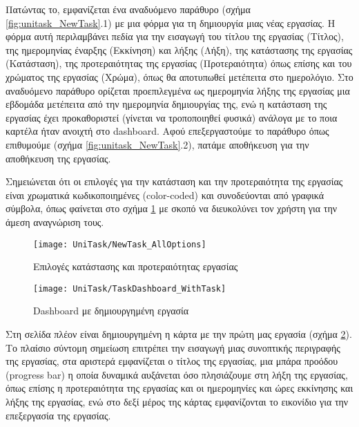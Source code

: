         Πατώντας το, εμφανίζεται ένα αναδυόμενο παράθυρο (σχήμα \ref{fig:unitask_NewTask}.1) με μια φόρμα για τη δημιουργία μιας νέας εργασίας. Η φόρμα αυτή περιλαμβάνει πεδία για την εισαγωγή του τίτλου της εργασίας ({\Zona Τίτλος}), της ημερομηνίας έναρξης ({\Zona Εκκίνηση}) και λήξης ({\Zona Λήξη}), της κατάστασης της εργασίας ({\Zona Κατάσταση}), της προτεραιότητας της εργασίας ({\Zona Προτεραιότητα}) όπως επίσης και του χρώματος της εργασίας ({\Zona Χρώμα}), όπως θα αποτυπωθεί μετέπειτα στο ημερολόγιο. Στο αναδυόμενο παράθυρο ορίζεται προεπιλεγμένα ως ημερομηνία λήξης της εργασίας μια εβδομάδα μετέπειτα από την ημερομηνία δημιουργίας της, ενώ η κατάσταση της εργασίας έχει προκαθοριστεί (γίνεται να τροποποιηθεί φυσικά) ανάλογα με το ποια καρτέλα ήταν ανοιχτή στο dashboard. Αφού επεξεργαστούμε το παράθυρο όπως επιθυμούμε (σχήμα \ref{fig:unitask_NewTask}.2), πατάμε αποθήκευση για την αποθήκευση της εργασίας.

        Σημειώνεται ότι οι επιλογές για την κατάσταση και την προτεραιότητα της εργασίας είναι χρωματικά κωδικοποιημένες (color-coded) και συνοδεύονται από γραφικά σύμβολα, όπως φαίνεται στο σχήμα \ref{fig:unitask_NewTask_AllOptions} με σκοπό να διευκολύνει τον χρήστη για την άμεση αναγνώριση τους.

        \begin{figure}[h!] \noindent \centering
            \texttt{[image: UniTask/NewTask\_AllOptions]}
            \caption{\centering Επιλογές κατάστασης και προτεραιότητας εργασίας}
            \label{fig:unitask_NewTask_AllOptions}
        \end{figure}

        \begin{figure}[h!] \noindent \centering
            \texttt{[image: UniTask/TaskDashboard\_WithTask]}
            \caption{\centering Dashboard με δημιουργημένη εργασία}
            \label{fig:unitask_TaskDashboard_WithTask}
        \end{figure}

        Στη σελίδα πλέον είναι δημιουργημένη η κάρτα με την πρώτη μας εργασία (σχήμα \ref{fig:unitask_TaskDashboard_WithTask}). Το πλαίσιο {\Zona σύντομη σημείωση} επιτρέπει την εισαγωγή μιας συνοπτικής περιγραφής της εργασίας, στα αριστερά εμφανίζεται ο τίτλος της εργασίας, μια μπάρα προόδου (progress bar) η οποία δυναμικά αυξάνεται όσο πλησιάζουμε στη λήξη της εργασίας, όπως επίσης η προτεραιότητα της εργασίας και οι ημερομηνίες και ώρες εκκίνησης και λήξης της εργασίας, ενώ στο δεξί μέρος της κάρτας εμφανίζονται το εικονίδιο για την επεξεργασία της εργασίας.

